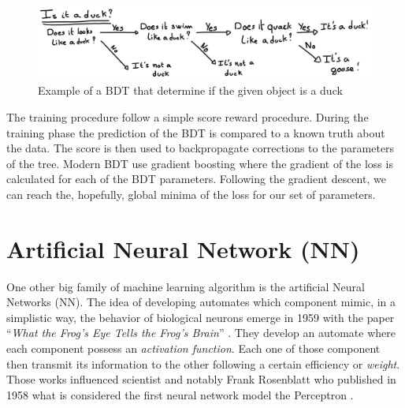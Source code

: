 \documentclass[../main.tex]{subfiles}
\begin{document}
\begin{figure}
  \centering
  \includegraphics[width=\linewidth]{images/ml/Bdt.jpg}
  \caption{Example of a BDT that determine if the given object is a duck}
  \label{fig:ml:bdt}
\end{figure}

The training procedure follow a simple score reward procedure. During the training phase the prediction of the BDT is compared to a known truth about the data. The score is then used to backpropagate corrections to the parameters of the tree. Modern BDT use gradient boosting where the gradient of the loss is calculated for each of the BDT parameters. Following the gradient descent, we can reach the, hopefully, global minima of the loss for our set of parameters.

\section{Artificial Neural Network (NN)}
\label{sec:ml:nn}

One other big family of machine learning algorithm is the artificial Neural Networks (NN). The idea of developing automates which component mimic, in a simplistic way, the behavior of biological neurons emerge in 1959 with the paper ``\textit{What the Frog's Eye Tells the Frog's Brain}'' \cite{lettvin_what_1959}. They develop an automate where each component possess an \textit{activation function}. Each one of those component then transmit its information to the other following a certain efficiency or \textit{weight}.
Those works influenced scientist and notably Frank Rosenblatt who published in 1958 what is considered the first neural network model the Perceptron \cite{rosenblatt_perceptron_1958}.
\end{document}

